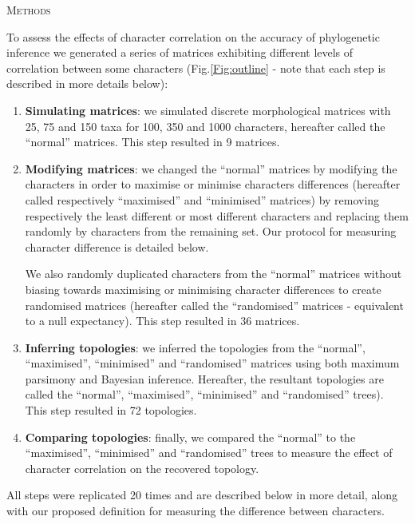 \documentclass[12pt,letterpaper]{article}
\renewcommand{\section}[1]{%
\bigskip
\begin{center}
\begin{Large}
\normalfont\scshape #1
\medskip
\end{Large}
\end{center}}
\begin{document}
\section{Methods}

To assess the effects of character correlation on the accuracy of phylogenetic inference we generated a series of matrices exhibiting different levels of correlation between some characters (Fig.\ref{Fig:outline} - note that each step is described in more details below):
\begin{enumerate}
    \item \textbf{Simulating matrices}: we simulated discrete morphological matrices with 25, 75 and 150 taxa for 100, 350 and 1000 characters, hereafter called the ``normal'' matrices. This step resulted in 9 matrices.

    \item \textbf{Modifying matrices}: we changed the ``normal'' matrices by modifying the characters in order to maximise or minimise characters differences (hereafter called respectively ``maximised'' and ``minimised'' matrices) by removing respectively the least different or most different characters and replacing them randomly by characters from the remaining set. Our protocol for measuring character difference is detailed below.
 
    We also randomly duplicated characters from the ``normal'' matrices without biasing towards maximising or minimising character differences to create randomised matrices (hereafter called the ``randomised'' matrices - equivalent to a null expectancy). This step resulted in 36 matrices.

\item \textbf{Inferring topologies}: we inferred the topologies from the ``normal'', ``maximised'', ``minimised'' and ``randomised'' matrices using both maximum parsimony and Bayesian inference.
Hereafter, the resultant topologies are called the ``normal'', ``maximised'', ``minimised'' and ``randomised'' trees).
This step resulted in 72 topologies.
    \item \textbf{Comparing topologies}: finally, we compared the ``normal'' to the ``maximised'', ``minimised'' and ``randomised'' trees to measure the effect of character correlation on the recovered topology.
\end{enumerate}
All steps were replicated 20 times and are described below in more detail, along with our proposed definition for measuring the difference between characters.
\end{document}

